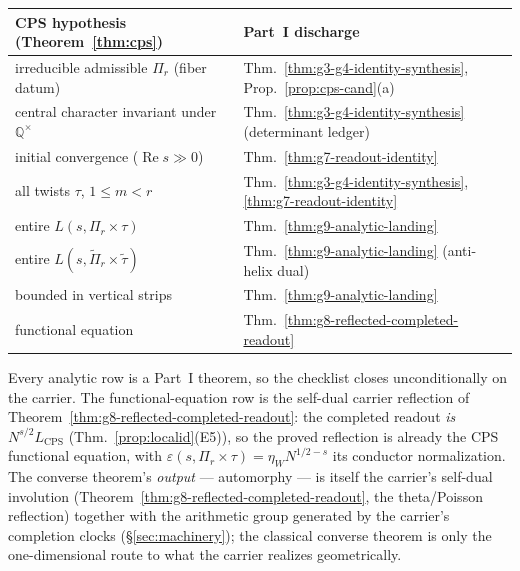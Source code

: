 \documentclass[11pt]{article}
\theoremstyle{definition}
\renewcommand{\Re}{\operatorname{Re}}
\begin{document}
\begin{center}
\begin{tabular}{ll}
\toprule
CPS hypothesis (Theorem~\ref{thm:cps}) & Part~I discharge \\
\midrule
irreducible admissible $\Pi_r$ (fiber datum) & Thm.~\ref{thm:g3-g4-identity-synthesis}, Prop.~\ref{prop:cps-cand}(a) \\
central character invariant under $\mathbb Q^\times$ & Thm.~\ref{thm:g3-g4-identity-synthesis} (determinant ledger) \\
initial convergence ($\Re s\gg0$) & Thm.~\ref{thm:g7-readout-identity} \\
all twists $\tau$, $1\le m<r$ & Thm.~\ref{thm:g3-g4-identity-synthesis}, \ref{thm:g7-readout-identity} \\
entire $L(s,\Pi_r\times\tau)$ & Thm.~\ref{thm:g9-analytic-landing} \\
entire $L(s,\widetilde\Pi_r\times\widetilde\tau)$ & Thm.~\ref{thm:g9-analytic-landing} (anti-helix dual) \\
bounded in vertical strips & Thm.~\ref{thm:g9-analytic-landing} \\
functional equation & Thm.~\ref{thm:g8-reflected-completed-readout} \\
\bottomrule
\end{tabular}
\end{center}

\noindent Every analytic row is a Part~I theorem, so the checklist closes unconditionally on the carrier.
The functional-equation row is the self-dual carrier reflection of
Theorem~\ref{thm:g8-reflected-completed-readout}: the completed readout \emph{is} $N^{s/2}L_{\mathrm{CPS}}$
(Thm.~\ref{prop:localid}(E5)), so the proved reflection is already the CPS functional equation, with
$\varepsilon(s,\Pi_r\times\tau)=\eta_W N^{1/2-s}$ its conductor normalization. The converse theorem's
\emph{output} --- automorphy --- is itself the carrier's self-dual involution
(Theorem~\ref{thm:g8-reflected-completed-readout}, the theta/Poisson reflection) together with the
arithmetic group generated by the carrier's completion clocks (\S\ref{sec:machinery}); the classical
converse theorem is only the one-dimensional route to what the carrier realizes geometrically.
\end{document}
